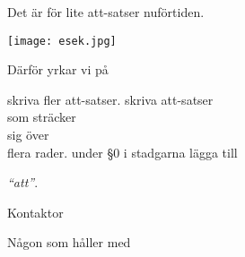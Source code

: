 \documentclass[../main/handlingar.tex]{subfiles}
\begin{document}

Det är för lite att-satser nuförtiden.

\begin{center}
    \texttt{[image: esek.jpg]}
\end{center}

Därför yrkar vi på
\begin{attsatser}
    \att skriva fler att-satser.
    \att
    skriva att-satser\\
    som sträcker\\
    sig över\\
    flera rader.
    \att under \S0 i stadgarna lägga till\par
    \emph{``att''}.
\end{attsatser}

\begin{signatures}{2}
    \mvh
    \signature{Erik Månsson}{Kontaktor}
    \signature{Måns Eriksson}{Någon som håller med}
\end{signatures}
\end{document}
